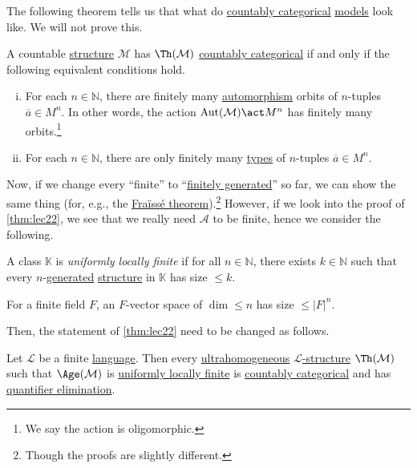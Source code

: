 The following theorem tells us that what do \hyperref[def:countably-categorical]{countably categorical} \hyperref[def:model]{models} look like. We will not prove this.

\begin{theorem}\label{thm:Ryll-Nardzewski}
	A countable \hyperref[def:structure]{structure} \(\mathcal{M} \) has \(\Th(\mathcal{M} )\) \hyperref[def:countably-categorical]{countably categorical} if and only if the following equivalent conditions hold.
	\begin{enumerate}[(i)]
		\item For each \(n\in \mathbb{N} \), there are finitely many \hyperref[def:automorphism]{automorphism} orbits of \(n\)-tuples \(\overline{a} \in M^n\). In other words, the action \(\operatorname{Aut}(\mathcal{M} )\act M^n\) has finitely many orbits.\footnote{We say the action is oligomorphic.}
		\item For each \(n\in \mathbb{N} \), there are only finitely many \hyperref[def:type]{types} of \(n\)-tuples \(\overline{a} \in M^n\).
	\end{enumerate}
\end{theorem}

Now, if we change every ``finite'' to ``\hyperref[def:finitely-generated]{finitely generated}'' so far, we can show the same thing (for, e.g., the \hyperref[thm:Fraisse]{Fraïssé theorem}).\footnote{Though the proofs are slightly different.} However, if we look into the proof of \autoref{thm:lec22}, we see that we really need \(\mathcal{A} \) to be finite, hence we consider the following.

\begin{definition}\label{def:uniformly-locally-finite}
	A class \(\mathbb{K} \) is \emph{uniformly locally finite} if for all \(n\in \mathbb{N} \), there exists \(k\in \mathbb{N} \) such that every \(n\)-\hyperref[def:finitely-generated]{generated} \hyperref[def:structure]{structure} in \(\mathbb{K} \) has size \(\leq k\).
\end{definition}

\begin{eg}
	For a finite field \(F\), an \(F\)-vector space of \(\dim \leq n\) has size \(\leq \vert F \vert ^n\).
\end{eg}

Then, the statement of \autoref{thm:lec22} need to be changed as follows.
\begin{theorem}\label{thm:lec22-new}
	Let \(\mathcal{L} \) be a finite \hyperref[def:language]{language}. Then every \hyperref[def:ultrahomogeneous]{ultrahomogeneous} \hyperref[def:structure]{\(\mathcal{L} \)-structure} \(\Th(\mathcal{M})\) such that \(\Age(\mathcal{M} )\) is \hyperref[def:uniformly-locally-finite]{uniformly locally finite} is \hyperref[def:countably-categorical]{countably categorical} and has \hyperref[def:quantifier-elimination]{quantifier elimination}.
\end{theorem}


